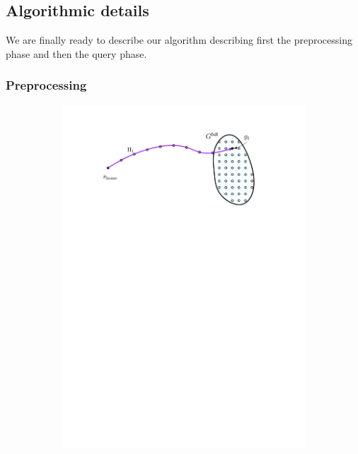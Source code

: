 \documentclass[conference]{IEEEtran}
\begin{document}
\subsection{Algorithmic details}
We are finally ready to describe our algorithm describing first the preprocessing phase and then  the query phase.

\subsubsection{Preprocessing}
\begin{figure}[t]
    \centering
    \begin{subfigure}{.225\textwidth}
        \includegraphics[width=\textwidth]{2_compute_root_paths_1}
        \caption{}
        \label{fig:crp1}
    \end{subfigure}
    \hspace{4mm}

\end{figure}
\end{document}
